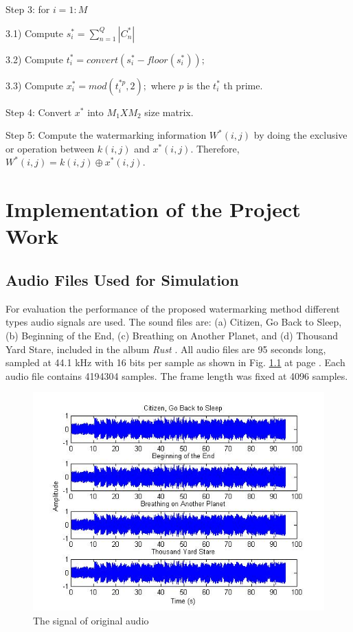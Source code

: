 \documentclass[12pt,a4paper]{report}
\begin{document}
Step 3:
for $i=1:M$

\bigskip

\hspace{10mm}3.1) Compute $s_i^*=\sum_{n=1}^{Q} |C_n^* |$

\bigskip

\hspace{10mm}3.2) Compute $ t_i^* = convert( s_i^* - floor(s_i^*) ); $

\bigskip

\hspace{10mm}3.3) Compute $ x_{i}^{*} = mod(t_{i}^{*p},2);$ where $p$ is the $t_i^*$ th prime.

\bigskip

Step 4:
Convert $ x^* $ into $M_{1}XM_{2}$ size matrix.

\bigskip

Step 5:
Compute the watermarking information $ W^*(i,j) $ by doing the exclusive or operation between $k(i,j)$ and $x^*(i,j)$. Therefore, $ W^*(i,j) = k(i,j) \oplus x^*(i,j). $


\chapter{Implementation of the Project Work}

\section{Audio Files Used for Simulation}

For evaluation the performance of the proposed watermarking method different types audio signals are used. The sound files are: (a) Citizen, Go Back to Sleep, (b) Beginning of the End, (c) Breathing on Another Planet, and (d) Thousand Yard Stare, included in the album \textit{Rust} \cite{rust}. All audio files are 95 seconds long, sampled at 44.1 kHz with 16 bits per sample as shown in Fig. \ref{fig:sample} at page \pageref{fig:sample} . Each audio file contains 4194304 samples. The frame length was fixed at 4096 samples.

\begin{figure}[h!]
\centering
\includegraphics[scale=.8]{image/sample.jpg}
\caption{The signal of original audio}
\label{fig:sample}
\end{figure}
\end{document}

